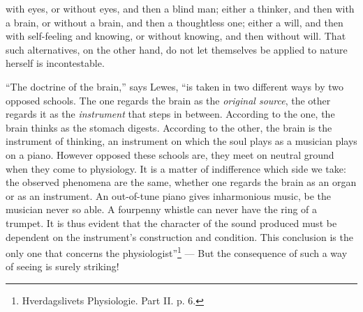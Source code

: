 \documentclass[12pt,a4paper]{book}
\begin{document}
\setcounter{footnote}{0}
with eyes, or without eyes, and then a blind man; either a thinker, and then with
a brain, or without a brain, and then a thoughtless one; either a will, and then
with self-feeling and knowing, or without knowing, and then without will. That
such alternatives, on the other hand, do not let themselves be applied to nature
herself is incontestable.

``The doctrine of the brain,'' says Lewes, ``is taken in two different ways by two
opposed schools. The one regards the brain as the \emph{original source}, the
other regards it as the \emph{instrument} that steps in between. According to the
one, the brain thinks as the stomach digests. According to the other, the brain
is the instrument of thinking, an instrument on which the soul plays as a
musician plays on a piano. However opposed these schools are, they meet on
neutral ground when they come to physiology. It is a matter of indifference which
side we take: the observed phenomena are the same, whether one regards the brain
as an organ or as an instrument. An out-of-tune piano gives inharmonious music,
be the musician never so able. A fourpenny whistle can never have the ring of a
trumpet. It is thus evident that the character of the sound produced must be
dependent on the instrument's construction and condition. This conclusion is the
only one that concerns the physiologist''\footnote{Hverdagslivets Physiologie.
Part II. p. 6.} --- But the consequence of such a way of seeing is surely
striking!
\end{document}
